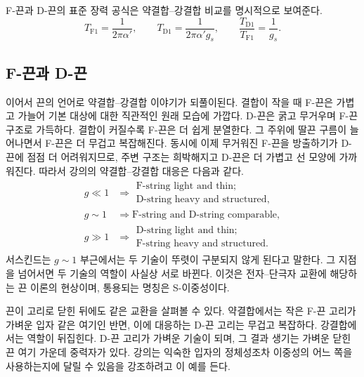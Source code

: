 F-끈과 D-끈의 표준 장력 공식은 약결합--강결합 비교를 명시적으로 보여준다.
\begin{equation}
T_{\mathrm{F1}}=\frac{1}{2\pi\alpha'},
\qquad
T_{\mathrm{D1}}=\frac{1}{2\pi\alpha' g_s},
\qquad
\frac{T_{\mathrm{D1}}}{T_{\mathrm{F1}}}=\frac{1}{g_s}.
\end{equation}

\subsection{F-끈과 D-끈}

이어서 끈의 언어로 약결합--강결합 이야기가 되풀이된다. 결합이 작을 때 F-끈은 가볍고 가늘어 기본 대상에 대한 직관적인 원래 모습에 가깝다. D-끈은 굵고 무거우며 F-끈 구조로 가득하다. 결합이 커질수록 F-끈은 더 쉽게 분열한다. 그 주위에 딸끈 구름이 늘어나면서 F-끈은 더 무겁고 복잡해진다. 동시에 이제 무거워진 F-끈을 방출하기가 D-끈에 점점 더 어려워지므로, 주변 구조는 희박해지고 D-끈은 더 가볍고 선 모양에 가까워진다. 따라서 강의의 약결합--강결합 대응은 다음과 같다.
\begin{align}
g \ll 1
&\Rightarrow
\begin{gathered}
\text{F-string light and thin;}\\
\text{D-string heavy and structured},
\end{gathered}\\
g \sim 1
&\Rightarrow
\text{F-string and D-string comparable},\\
g \gg 1
&\Rightarrow
\begin{gathered}
\text{D-string light and thin;}\\
\text{F-string heavy and structured}.
\end{gathered}
\end{align}
서스킨드는 \(g\sim 1\) 부근에서는 두 기술이 뚜렷이 구분되지 않게 된다고 말한다. 그 지점을 넘어서면 두 기술의 역할이 사실상 서로 바뀐다. 이것은 전자--단극자 교환에 해당하는 끈 이론의 현상이며, 통용되는 명칭은 S-이중성이다.

끈이 고리로 닫힌 뒤에도 같은 교환을 살펴볼 수 있다. 약결합에서는 작은 F-끈 고리가 가벼운 입자 같은 여기인 반면, 이에 대응하는 D-끈 고리는 무겁고 복잡하다. 강결합에서는 역할이 뒤집힌다. D-끈 고리가 가벼운 기술이 되며, 그 결과 생기는 가벼운 닫힌끈 여기 가운데 중력자가 있다. 강의는 익숙한 입자의 정체성조차 이중성의 어느 쪽을 사용하는지에 달릴 수 있음을 강조하려고 이 예를 든다.

